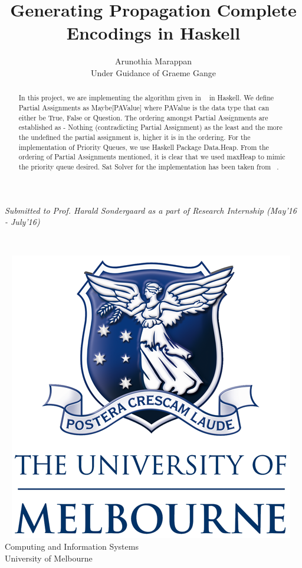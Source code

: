 \documentclass{article}
\title{Generating Propagation Complete Encodings in Haskell \\ }
\author{\vspace{2mm} \large Arunothia Marappan \\ Under Guidance of Graeme Gange }
\date{}
\theoremstyle{plain}
\begin{document}
\maketitle
\begin{center}
\emph{Submitted to Prof. Harald Sondergaard as a part of Research Internship (May'16 - July'16)}
\end{center}
\vspace*{2cm}~
\begin{abstract}
 In this project, we are implementing the algorithm given in ~\cite{PCE} in Haskell. We define Partial Assignments as Maybe[PAValue] where PAValue is the data type that can either be True, False or Question. The ordering amongst Partial Assignments are established as - Nothing (contradicting Partial Assignment) as the least and the more the undefined the partial assignment is, higher it is in the ordering. For the implementation of Priority Queues, we use Haskell Package Data.Heap. From the ordering of Partial Assignments mentioned, it is clear that we used maxHeap to mimic the priority queue desired. Sat Solver for the implementation has been taken from ~\cite{sat.hs}.      
\end{abstract}

\begin{center}
\vspace*{7cm}~ \includegraphics[scale=1]{UOM.png} \\
\large{Computing and Information Systems \\ University of Melbourne}
\end{center}
\newpage
\nocite{*}


\end{document}
